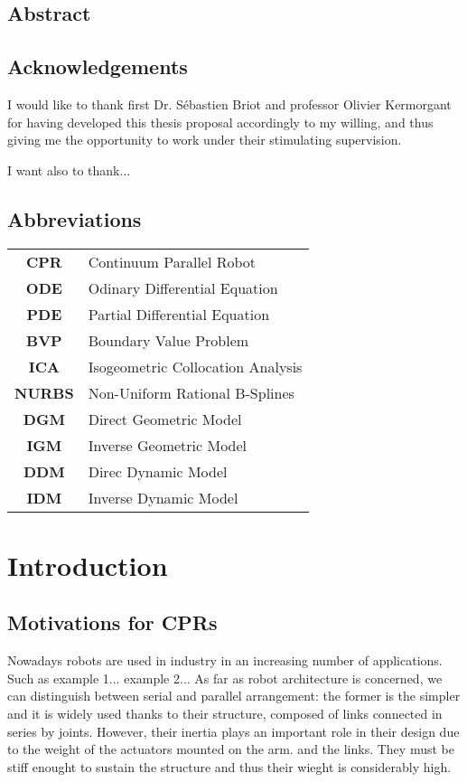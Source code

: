 \documentclass{thesisreport}
\begin{document}
   
 
  \section*{Abstract}
   
 
 
 
 \newpage
 
 \section*{Acknowledgements}
 I would like to thank first Dr. Sébastien Briot and professor Olivier Kermorgant for having developed this thesis proposal accordingly to my willing, and thus giving me the opportunity to work under their stimulating supervision. 
 
 I want also to thank...
 
  \section*{Abbreviations}
 \begin{tabular}{cp{}}
 	\textbf{CPR}	&	Continuum Parallel Robot			\\
 	\textbf{ODE}	&	Odinary Differential Equation		\\
 	\textbf{PDE}	&	Partial Differential Equation		\\
 	\textbf{BVP}	&	Boundary Value Problem				\\
 	\textbf{ICA}	&	Isogeometric Collocation Analysis	\\
 	\textbf{NURBS}	&	Non-Uniform Rational B-Splines		\\
 	\textbf{DGM}	&	Direct Geometric Model				\\
 	\textbf{IGM}	&	Inverse Geometric Model				\\
 	\textbf{DDM}	&	Direc Dynamic Model					\\
 	\textbf{IDM}	&	Inverse Dynamic Model				\\
 \end{tabular}

 \tableofcontents
 
 
 \chapter*{Introduction}
 \section{Motivations for CPRs}
  Nowadays robots are used in industry in an increasing number of applications. Such as example 1... example 2...
 As far as robot architecture is concerned, we can distinguish between serial and parallel arrangement: the former is the simpler and it is widely used thanks to their structure, composed of links connected in series by joints. However, their inertia plays an important role in their design due to the weight of the actuators mounted on the arm. and the links. They must be stiff enought to sustain the structure and thus their wieght is considerably high.
 
\end{document}
